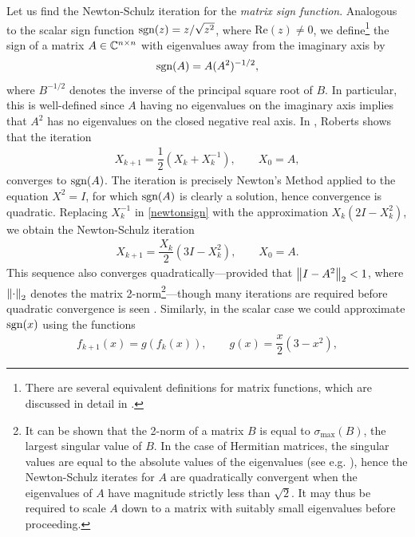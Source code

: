 \bigskip{}

Let us find the Newton-Schulz iteration for the \textit{matrix sign function}. Analogous to the scalar sign function $\text{sgn}(z)=z/\sqrt{z^2}$, where $\text{Re}(z)\neq 0$, we define\footnote{There are several equivalent definitions for matrix functions, which are discussed in detail in \cite[Chapter 1]{Higham}.} the sign of a matrix $A \in \mathbb{C}^{n\times n}$ with eigenvalues away from the imaginary axis by
\[\text{sgn}(A)=A(A^2)^{-1/2},\]
where $B^{-1/2}$ denotes the inverse of the principal square root of $B$. In particular, this is well-defined since $A$ having no eigenvalues on the imaginary axis implies that $A^2$ has no eigenvalues on the closed negative real axis. In \cite[Section 1.3]{roberts}, Roberts shows that the iteration
\begin{align}
    X_{k+1}=\dfrac{1}{2}(X_k + X_k^{-1}), \qquad X_0 = A, \label{newtonsign}
\end{align}
converges to $\text{sgn}(A)$. The iteration is precisely Newton's Method applied to the equation $X^2=I$, for which $\text{sgn}(A)$ is clearly a solution, hence convergence is quadratic. Replacing $X_k^{-1}$ in \eqref{newtonsign} with the approximation $X_k(2I-X_k^2)$, we obtain the Newton-Schulz iteration
\begin{align*}
    X_{k+1}=\dfrac{X_k}{2}(3I - X_k^2), \qquad X_0 = A.
\end{align*}
This sequence also converges quadratically---provided that $\left\lVert I-A^2\right\rVert_2<1$, where $\left\lVert\cdot\right\rVert_2$ denotes the matrix 2-norm\footnote{It can be shown that the 2-norm of a matrix $B$ is equal to $\sigma_{\max}(B)$, the largest singular value of $B$. In the case of Hermitian matrices, the singular values are equal to the absolute values of the eigenvalues (see e.g$.$ \cite{NLAbook}), hence the Newton-Schulz iterates for $A$ are quadratically convergent when the eigenvalues of $A$ have magnitude strictly less than $\sqrt{2}$. It may thus be required to scale $A$ down to a matrix with suitably small eigenvalues before proceeding.}---though many iterations are required before quadratic convergence is seen \cite[Theorem 1.1]{chen}. Similarly, in the scalar case we could approximate $\text{sgn}(x)$ using the functions
\begin{align}
f_{k+1}(x)=g(f_k(x)), \qquad g(x)=\dfrac{x}{2}(3-x^2),\label{scalarNSsign}
\end{align}

